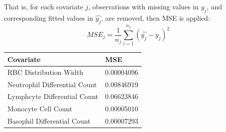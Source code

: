 \documentclass[landscape,a0paper,fontscale=0.285]{baposter} %
\begin{document}
\begin{poster}
{That is, for each covariate $j$, observations with missing values in $y_{j}$, and corresponding fitted values in $\hat{y_{j}}$, are removed, then MSE is applied: $$ MSE_{j} = \frac{1}{n_{j}} \sum_{i = 1}^{n_{j}} (\hat{y_{j}} - y_{j})^{2} $$

\begin{center}
\begin{tabular}{l l}
\toprule
\textbf{Covariate} & \textbf{MSE}\\
\midrule
RBC Distribution Width & 0.00004096 \\
Neutrophil Differential Count & 0.00846919 \\
Lymphcyte Differential Count & 0.06623846 \\
Monocyte Cell Count & 0.00005010 \\
Basophil Differential Count & 0.00007293 \\
\bottomrule
\end{tabular}
\end{center}

}


\end{poster}
\end{document}

